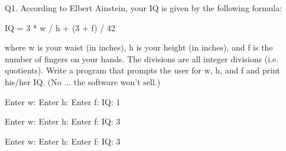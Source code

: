Q1. According to Elbert Ainstein, your IQ is given by the following formula:
\begin{console}[frame=none]

	IQ = 3 * w / h + (3 + f) / 42

\end{console}
where w is your waist (in inches), 
h is your height (in inches), 
and f is the number of fingers on your hands. 
The divisions are all integer divisions (i.e. quotients). 
Write a program that prompts the user for w, h, and f and print his/her IQ. 
(No ... the software won't sell.) 

\resett
\nextt
\begin{console}[commandchars=\\\{\}]
Enter w: 
Enter h: 
Enter f: 
IQ: 1
\end{console}

\nextt
\begin{console}[commandchars=\\\{\}]
Enter w: 
Enter h: 
Enter f: 
IQ: 3
\end{console}

\nextt
\begin{console}[commandchars=\\\{\}]
Enter w: 
Enter h: 
Enter f: 
IQ: 3
\end{console}

